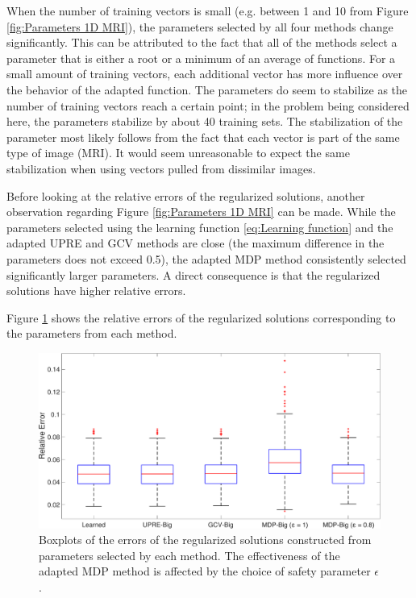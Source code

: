 \documentclass[12pt]{article}
\begin{document}
\noindent When the number of training vectors is small (e.g. between 1 and 10 from Figure \ref{fig:Parameters 1D MRI}), the parameters selected by all four methods change significantly. This can be attributed to the fact that all of the methods select a parameter that is either a root or a minimum of an average of functions. For a small amount of training vectors, each additional vector has more influence over the behavior of the adapted function. The parameters do seem to stabilize as the number of training vectors reach a certain point; in the problem being considered here, the parameters stabilize by about 40 training sets. The stabilization of the parameter most likely follows from the fact that each vector is part of the same type of image (MRI). It would seem unreasonable to expect the same stabilization when using vectors pulled from dissimilar images. \par 
Before looking at the relative errors of the regularized solutions, another observation regarding Figure \ref{fig:Parameters 1D MRI} can be made. While the parameters selected using the learning function \eqref{eq:Learning function} and the adapted UPRE and GCV methods are close (the maximum difference in the parameters does not exceed 0.5), the adapted MDP method consistently selected significantly larger parameters. A direct consequence is that the regularized solutions have higher relative errors. \par
Figure \ref{fig:Errors 1D MRI} shows the relative errors of the regularized solutions corresponding to the parameters from each method. 

\begin{figure}[ht]
\includegraphics[width=1.0\textwidth]{Figures/Errors1D_mri.pdf}
\caption{Boxplots of the errors of the regularized solutions constructed from parameters selected by each method. The effectiveness of the adapted MDP method is affected by the choice of safety parameter $\epsilon$.}
\label{fig:Errors 1D MRI}
\end{figure}
\end{document}
